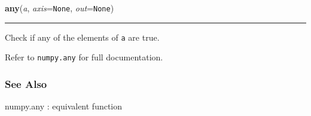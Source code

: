     \begin{boxedminipage}{\textwidth}

    \raggedright \textbf{any}(\textit{a}, \textit{axis}=\texttt{None}, \textit{out}=\texttt{None})

    \vspace{-1.5ex}

    \rule{\textwidth}{0.5\fboxrule}

Check if any of the elements of \texttt{a} are true.

Refer to \texttt{numpy.any} for full documentation.



\hypertarget{see-also}{}
\subsubsection*{See Also}

numpy.any : equivalent function
    \vspace{1ex}

    \end{boxedminipage}

    \label{numpy:ndarray:argmax}

    \vspace{0.5ex}

